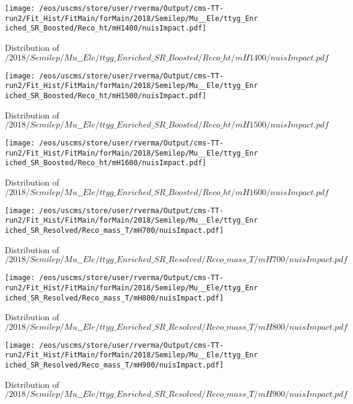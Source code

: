 \begin{figure}
\centering
\texttt{[image: /eos/uscms/store/user/rverma/Output/cms-TT-run2/Fit\_Hist/FitMain/forMain/2018/Semilep/Mu\_\_Ele/ttyg\_Enriched\_SR\_Boosted/Reco\_ht/mH1400/nuisImpact.pdf]}
\caption{Distribution of $/2018/Semilep/Mu\_\_Ele/ttyg\_Enriched\_SR\_Boosted/Reco\_ht/mH1400/nuisImpact.pdf$}
\end{figure}

\begin{figure}
\centering
\texttt{[image: /eos/uscms/store/user/rverma/Output/cms-TT-run2/Fit\_Hist/FitMain/forMain/2018/Semilep/Mu\_\_Ele/ttyg\_Enriched\_SR\_Boosted/Reco\_ht/mH1500/nuisImpact.pdf]}
\caption{Distribution of $/2018/Semilep/Mu\_\_Ele/ttyg\_Enriched\_SR\_Boosted/Reco\_ht/mH1500/nuisImpact.pdf$}
\end{figure}

\begin{figure}
\centering
\texttt{[image: /eos/uscms/store/user/rverma/Output/cms-TT-run2/Fit\_Hist/FitMain/forMain/2018/Semilep/Mu\_\_Ele/ttyg\_Enriched\_SR\_Boosted/Reco\_ht/mH1600/nuisImpact.pdf]}
\caption{Distribution of $/2018/Semilep/Mu\_\_Ele/ttyg\_Enriched\_SR\_Boosted/Reco\_ht/mH1600/nuisImpact.pdf$}
\end{figure}

\begin{figure}
\centering
\texttt{[image: /eos/uscms/store/user/rverma/Output/cms-TT-run2/Fit\_Hist/FitMain/forMain/2018/Semilep/Mu\_\_Ele/ttyg\_Enriched\_SR\_Resolved/Reco\_mass\_T/mH700/nuisImpact.pdf]}
\caption{Distribution of $/2018/Semilep/Mu\_\_Ele/ttyg\_Enriched\_SR\_Resolved/Reco\_mass\_T/mH700/nuisImpact.pdf$}
\end{figure}

\begin{figure}
\centering
\texttt{[image: /eos/uscms/store/user/rverma/Output/cms-TT-run2/Fit\_Hist/FitMain/forMain/2018/Semilep/Mu\_\_Ele/ttyg\_Enriched\_SR\_Resolved/Reco\_mass\_T/mH800/nuisImpact.pdf]}
\caption{Distribution of $/2018/Semilep/Mu\_\_Ele/ttyg\_Enriched\_SR\_Resolved/Reco\_mass\_T/mH800/nuisImpact.pdf$}
\end{figure}

\begin{figure}
\centering
\texttt{[image: /eos/uscms/store/user/rverma/Output/cms-TT-run2/Fit\_Hist/FitMain/forMain/2018/Semilep/Mu\_\_Ele/ttyg\_Enriched\_SR\_Resolved/Reco\_mass\_T/mH900/nuisImpact.pdf]}
\caption{Distribution of $/2018/Semilep/Mu\_\_Ele/ttyg\_Enriched\_SR\_Resolved/Reco\_mass\_T/mH900/nuisImpact.pdf$}
\end{figure}

